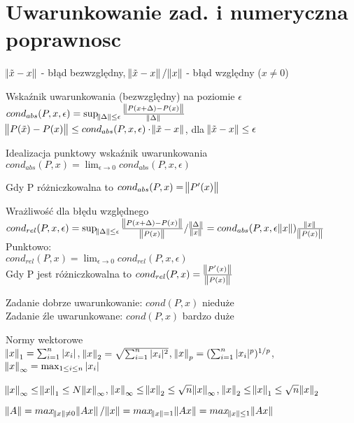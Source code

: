 \section{Uwarunkowanie zad. i numeryczna poprawnosc}

\entry
$\norm{\tilde{x}-x}$ - błąd bezwzględny, $\norm{\tilde{x}-x}/\norm{x}$ - błąd względny ($x \neq 0$)

\entry
Wskaźnik uwarunkowania (bezwzględny) na poziomie $\epsilon$\\
$cond_{abs}(P,x,\epsilon) = \sup_{\norm{\Delta} \leq \epsilon} \frac{\norm{P(x+\Delta) - P(x)}}{\norm{\Delta}}$\\
$\norm{P(\tilde{x}) - P(x)} \leq cond_{abs}(P,x,\epsilon) \cdot \norm{\tilde{x}-x}$, dla $\norm{\tilde{x}-x} \leq \epsilon$

\entry
Idealizacja punktowy wskaźnik uwarunkowania\\
$cond_{abs}(P,x) = \lim_{\epsilon \to 0} cond_{abs}(P,x,\epsilon)$

\entry
Gdy P różniczkowalna to $cond_{abs}(P,x) = \norm{P'(x)}$

\entry
Wrażliwość dla błędu względnego\\
$cond_{rel}(P,x,\epsilon) = \sup_{\norm{\Delta} \leq \epsilon} \frac{\norm{P(x+\Delta) - P(x)}}{\norm{P(x)}} / \frac{\norm{\Delta}}{\norm{x}} = cond_{abs}(P,x,\epsilon\norm{x})\frac{\norm{x}}{\norm{P(x)}}$\\
Punktowo:\\
$cond_{rel}(P,x) = \lim_{\epsilon \to 0} cond_{rel}(P,x,\epsilon)$\\
Gdy P jest różniczkowalna to $cond_{rel}(P,x) = \frac{\norm{P'(x)}}{\norm{P(x)}}$

\entry
Zadanie dobrze uwarunkowanie: $cond(P,x)$ nieduże\\
Zadanie źle uwarunkowane: $cond(P,x)$ bardzo duże 

\entry
Normy wektorowe\\
$\norm{x}_1 = \sum_{i=1}^n |x_i|$, $\norm{x}_2 = \sqrt{\sum_{i=1}^n |x_i|^2}$, $\norm{x}_p = (\sum_{i=1}^n |x_i|^p)^{1/p}$, $\norm{x}_\infty = \max_{1 \leq i \leq n} |x_i|$

\entry
$\norm{x}_\infty \leq \norm{x}_1 \leq N \norm{x}_\infty$, $\norm{x}_\infty \leq \norm{x}_2 \leq \sqrt{n} \norm{x}_\infty$, $\norm{x}_2 \leq \norm{x}_1 \leq \sqrt{n} \norm{x}_2$

\entry
$\norm{A} = max_{\norm{x} \neq 0} \norm{Ax} / \norm{x} = max_{\norm{x}=1}\norm{Ax} = max_{\norm{x} \leq 1}\norm{Ax}$

